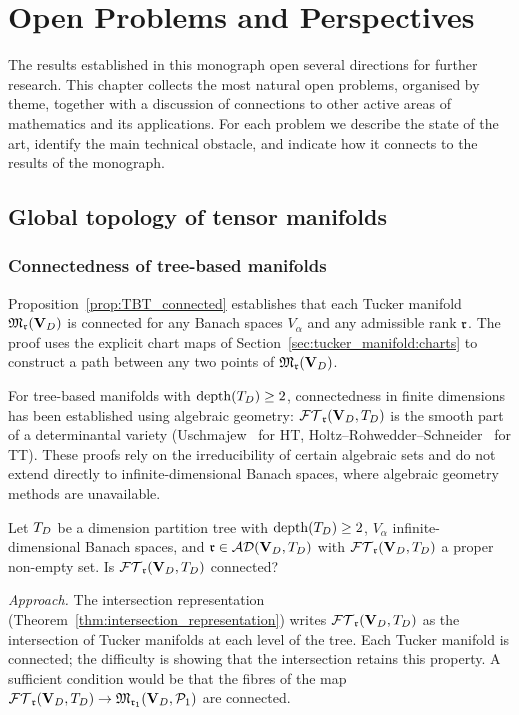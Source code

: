 %

\chapter{Open Problems and Perspectives}
\label{chap:open}

The results established in this monograph open several directions for
further research. This chapter collects the most natural open problems,
organised by theme, together with a discussion of connections to other
active areas of mathematics and its applications. For each problem we
describe the state of the art, identify the main technical obstacle, and
indicate how it connects to the results of the monograph.

\section{Global topology of tensor manifolds}
\label{sec:open:topology}

\subsection*{Connectedness of tree-based manifolds}

Proposition~\ref{prop:TBT_connected} establishes that each Tucker
manifold $\mathfrak{M}_{\mathfrak{r}}(\mathbf{V}_D)$ is connected for any Banach spaces $V_\alpha$
and any admissible rank $\mathfrak{r}$. The proof uses the explicit chart maps
of Section~\ref{sec:tucker_manifold:charts} to construct a path between
any two points of $\mathfrak{M}_{\mathfrak{r}}(\mathbf{V}_D)$.

For tree-based manifolds with $\mathrm{depth}(T_D) \geq 2$, connectedness in
finite dimensions has been established using algebraic geometry:
$\mathcal{FT}_{\mathfrak{r}}(\mathbf{V}_D,T_D)$ is the smooth part of a determinantal variety
(Uschmajew~\cite{UschmajewVandereycken2013} for HT, Holtz--Rohwedder--Schneider~\cite{HoltzRohwedderSchneider2012}
for TT). These proofs rely on the irreducibility of certain algebraic
sets and do not extend directly to infinite-dimensional Banach spaces,
where algebraic geometry methods are unavailable.

\begin{problem}
\label{prob:connected}
Let $T_D$ be a dimension partition tree with $\mathrm{depth}(T_D) \geq 2$,
$V_\alpha$ infinite-dimensional Banach spaces, and $\mathfrak{r} \in \mathcal{AD}(\mathbf{V}_D,T_D)$
with $\mathcal{FT}_{\mathfrak{r}}(\mathbf{V}_D,T_D)$ a proper non-empty set. Is $\mathcal{FT}_{\mathfrak{r}}(\mathbf{V}_D,T_D)$ connected?

\emph{Approach.} The intersection representation
(Theorem~\ref{thm:intersection_representation}) writes $\mathcal{FT}_{\mathfrak{r}}(\mathbf{V}_D,T_D)$ as the
intersection of Tucker manifolds at each level of the tree. Each
Tucker manifold is connected; the difficulty is showing that the
intersection retains this property. A sufficient condition would be
that the fibres of the map $\mathcal{FT}_{\mathfrak{r}}(\mathbf{V}_D,T_D) \to \mathfrak{M}_{\mathfrak{r}_1}(\mathbf{V}_D,\mathcal{P}_1)$
are connected.
\end{problem}

